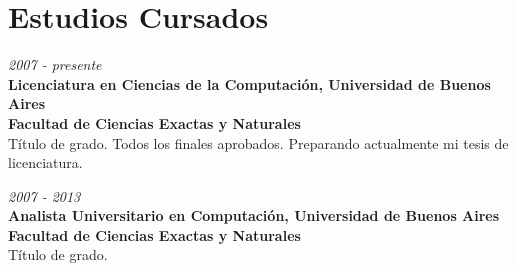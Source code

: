 \section{Estudios Cursados}

\begin{large}
    \textit{2007 - presente}\\
	   \textbf{Licenciatura en Ciencias de la Computación, Universidad de Buenos Aires}\\
       \textbf{Facultad de Ciencias Exactas y Naturales}\\
	  Título de grado. Todos los finales aprobados. Preparando actualmente mi tesis de licenciatura.\\
\end{large}

\begin{large}
\noindent    \textit{2007 - 2013}\\
	   \textbf{Analista Universitario en Computación, Universidad de Buenos Aires}\\
       \textbf{Facultad de Ciencias Exactas y Naturales}\\
	  Título de grado.\\
\end{large}

